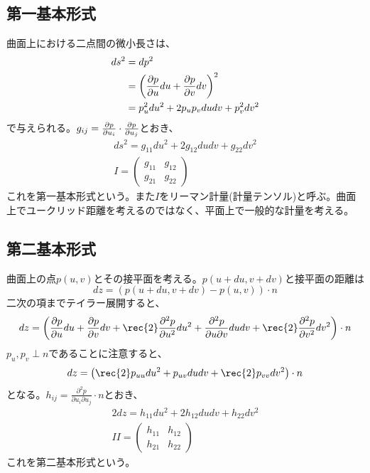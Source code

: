     \subsection{第一基本形式}
        曲面上における二点間の微小長さは、
        \begin{align*}
            ds^2 &= dp^2\\
            &= \lr{\pd[p]{u}du+\pd[p]{v}dv}^2\\
            &= p_u^2du^2+2p_up_vdudv+p_v^2dv^2
        \end{align*}
        で与えられる。$g_{ij}=\pd[p]{u_i}\cdot \pd[p]{u_j}$とおき、
        \begin{gather*}
            ds^2 = g_{11}du^2+2g_{12}dudv+g_{22}dv^2 \\
            I = \begin{pmatrix}
                g_{11} & g_{12}\\
                g_{21} & g_{22}
               \end{pmatrix}
        \end{gather*}
        これを第一基本形式という。また$I$をリーマン計量(計量テンソル)と呼ぶ。曲面上でユークリッド距離を考えるのではなく、平面上で一般的な計量を考える。

    \subsection{第二基本形式}
        曲面上の点$p(u,v)$とその接平面を考える。$p(u+du,v+dv)$と接平面の距離は
            \[dz = (p(u+du,v+dv)-p(u,v))\cdot n\]
        二次の項までテイラー展開すると、
            \[
                dz = \lr{\pd[p]{u}du+\pd[p]{v}dv
                + \rec{2}\pd[^2p]{u^2}du^2
                + \frac{\partial^2 p}{\partial u\partial v}dudv
                + \rec{2}\pd[^2p]{v^2}dv^2}\cdot n
            \]
        $p_u,p_v\perp n$であることに注意すると、
            \[dz = \lr{\rec{2}p_{uu}du^2 + p_{uv}dudv + \rec{2}p_{vv}dv^2} \cdot n\]
        となる。$h_{ij}=\frac{\partial^2p}{\partial u_i\partial u_j}\cdot n$とおき、
        \begin{gather*}
            2dz = h_{11}du^2+2h_{12}dudv+h_{22}dv^2 \\
            II = \begin{pmatrix}
                h_{11} & h_{12}\\
                h_{21} & h_{22}
               \end{pmatrix}
        \end{gather*}
        これを第二基本形式という。

